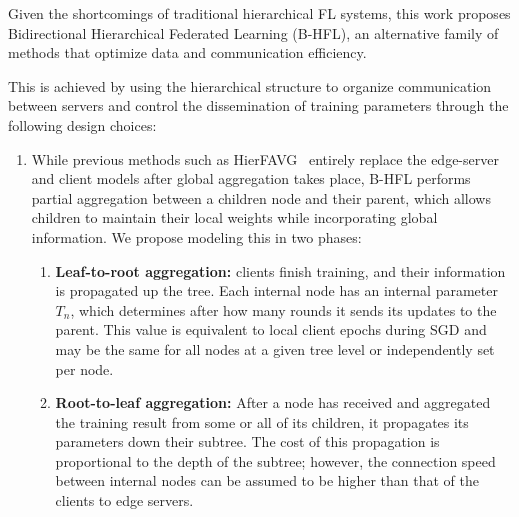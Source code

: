 



Given the shortcomings of traditional hierarchical FL systems, this work proposes Bidirectional Hierarchical Federated Learning (B-HFL), an alternative family of methods that optimize data and communication efficiency.

This is achieved by using the hierarchical structure to organize communication between servers and control the dissemination of training parameters through the following design choices:
\begin{enumerate}
    \item While previous methods such as HierFAVG~\citep{Client-Edge-CloudHierFL,Hier_Het_Cellular} entirely replace the edge-server and client models after global aggregation takes place, B-HFL performs partial aggregation between a children node and their parent, which allows children to maintain their local weights while incorporating global information. We propose modeling this in two phases:

          \begin{enumerate}
              \item \textbf{Leaf-to-root aggregation:} clients finish training, and their information is propagated up the tree. Each internal node has an internal parameter $T_n$, which determines after how many rounds it sends its updates to the parent. This value is equivalent to local client epochs during SGD and may be the same for all nodes at a given tree level or independently set per node.
              \item \textbf{Root-to-leaf aggregation:} After a node has received and aggregated the training result from some or all of its children, it propagates its parameters down their subtree. The cost of this propagation is proportional to the depth of the subtree; however, the connection speed between internal nodes can be assumed to be higher than that of the clients to edge servers.
          \end{enumerate}


\end{enumerate}
